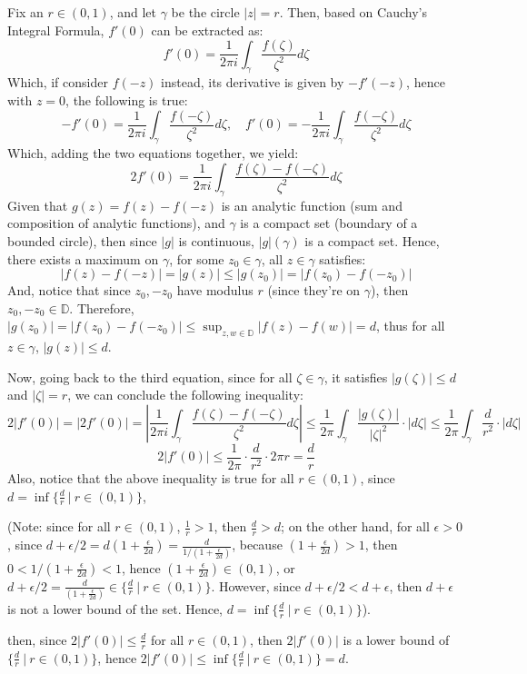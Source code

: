 \documentclass{article}
\begin{document}
Fix an $r\in(0,1)$, and let $\gamma$ be the circle $|z|=r$. Then, based on Cauchy's Integral Formula, $f'(0)$ can be extracted as:
$$f'(0)=\frac{1}{2\pi i}\int_{\gamma}\frac{f(\zeta)}{\zeta^2}d\zeta$$
Which, if consider $f(-z)$ instead, its derivative is given by $-f'(-z)$, hence with $z=0$, the following is true:
$$-f'(0)=\frac{1}{2\pi i}\int_{\gamma}\frac{f(-\zeta)}{\zeta^2}d\zeta,\quad f'(0)=-\frac{1}{2\pi i}\int_{\gamma}\frac{f(-\zeta)}{\zeta^2}d\zeta$$
Which, adding the two equations together, we yield:
$$2f'(0)=\frac{1}{2\pi i}\int_{\gamma}\frac{f(\zeta)-f(-\zeta)}{\zeta^2}d\zeta$$
Given that $g(z)=f(z)-f(-z)$ is an analytic function (sum and composition of analytic functions), and $\gamma$ is a compact set (boundary of a bounded circle),
then since $|g|$ is continuous, $|g|(\gamma)$ is a compact set. Hence, there exists a maximum on $\gamma$, for some $z_0\in\gamma$, all $z\in\gamma$ satisfies:
$$|f(z)-f(-z)|=|g(z)|\leq |g(z_0)|=|f(z_0)-f(-z_0)|$$
And, notice that since $z_0, -z_0$ have modulus $r$ (since they're on $\gamma$), then $z_0,-z_0\in \mathbb{D}$. Therefore,
$|g(z_0)|=|f(z_0)-f(-z_0)| \leq \sup_{z,w\in\mathbb{D}}|f(z)-f(w)| = d$, thus for all $z\in\gamma$, $|g(z)|\leq d$.

\hfill

Now, going back to the third equation, since for all $\zeta\in\gamma$, it satisfies $|g(\zeta)|\leq d$ and $|\zeta| = r$, we can conclude the following inequality:
$$2|f'(0)| = |2f'(0)| = \left|\frac{1}{2\pi i}\int_{\gamma}\frac{f(\zeta)-f(-\zeta)}{\zeta^2}d\zeta\right|\leq\frac{1}{2\pi}\int_{\gamma}\frac{|g(\zeta)|}{|\zeta|^2}\cdot|d\zeta| \leq \frac{1}{2\pi}\int_{\gamma}\frac{d}{r^2}\cdot |d\zeta|$$
$$2|f'(0)| \leq \frac{1}{2\pi}\cdot \frac{d}{r^2}\cdot 2\pi r = \frac{d}{r}$$
Also, notice that the above inequality is true for all $r\in (0,1)$, since $d = \inf\{\frac{d}{r}\ |\ r\in(0,1)\}$,

(Note: since for all $r\in (0,1)$, $\frac{1}{r}>1$, then $\frac{d}{r}>d$; on the other hand, for all $\epsilon>0$, since $d+\epsilon/2 = d(1+\frac{\epsilon}{2d}) = \frac{d}{1/(1+\frac{\epsilon}{2d})}$,
because $(1+\frac{\epsilon}{2d})>1$, then $0<1/(1+\frac{\epsilon}{2d})<1$, hence $(1+\frac{\epsilon}{2d})\in (0,1)$, or $d+\epsilon/2=\frac{d}{(1+\frac{\epsilon}{2d})}\in \{\frac{d}{r}\ |\ r\in(0,1)\}$.
However, since $d+\epsilon/2 < d+\epsilon$, then $d+\epsilon$ is not a lower bound of the set. Hence, $d=\inf\{\frac{d}{r}\ |\ r\in(0,1)\}$).

then, since $2|f'(0)| \leq \frac{d}{r}$ for all $r\in(0,1)$, then $2|f'(0)|$ is a lower bound of $\{\frac{d}{r}\ |\ r\in(0,1)\}$,
hence $2|f'(0)| \leq \inf\{\frac{d}{r}\ |\ r\in(0,1)\} = d$.
\end{document}
